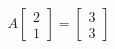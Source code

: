 \documentclass[preview]{standalone}
\begin{document}
\begin{align*}
A\begin{bmatrix} 2 \\ 1 \end{bmatrix} = \begin{bmatrix} 3 \\ 3 \end{bmatrix}
\end{align*}
\end{document}
